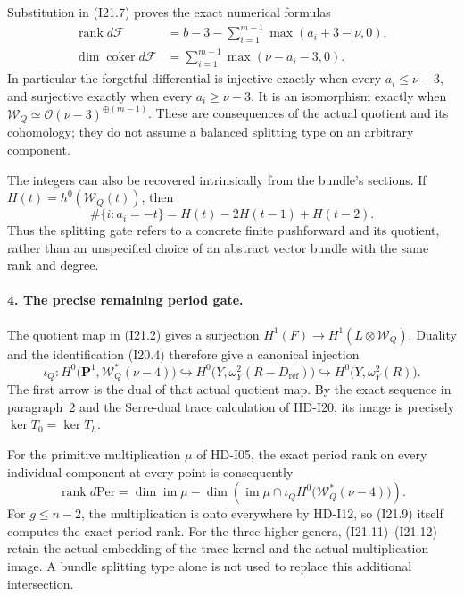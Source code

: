 Substitution in (I21.7) proves the exact numerical formulas
\begin{equation}
 \boxed{\begin{aligned}
 \operatorname{rank}d\mathcal F
       &=b-3-\sum_{i=1}^{m-1}\max(a_i+3-\nu,0),\\
 \dim\operatorname{coker}d\mathcal F
       &=\sum_{i=1}^{m-1}\max(\nu-a_i-3,0).
 \end{aligned}}                                      \tag{I21.9}
\end{equation}
In particular the forgetful differential is injective exactly
when every $a_i\leq\nu-3$, and surjective exactly when every
$a_i\geq\nu-3$. It is an isomorphism exactly when
$\mathcal W_Q\simeq\mathcal O(\nu-3)^{\oplus(m-1)}$.
These are consequences of the actual quotient and its cohomology;
they do not assume a balanced splitting type on an arbitrary
component.

The integers can also be recovered intrinsically from the bundle's
sections. If $H(t)=h^0(\mathcal W_Q(t))$, then
\begin{equation}
 \#\{i:a_i=-t\}=H(t)-2H(t-1)+H(t-2).                 \tag{I21.10}
\end{equation}
Thus the splitting gate refers to a concrete finite pushforward
and its quotient, rather than an unspecified choice of an
abstract vector bundle with the same rank and degree.

\paragraph{4. The precise remaining period gate.}
The quotient map in (I21.2) gives a surjection
$H^1(F)\to H^1(L\otimes\mathcal W_Q)$. Duality and the
identification (I20.4) therefore give a canonical injection
\begin{equation}
 \iota_Q:
 H^0\bigl(\mathbf P^1,\mathcal W_Q^*(\nu-4)\bigr)
       \hookrightarrow
 H^0\bigl(Y,\omega_Y^2(R-D_{\mathrm{ref}})\bigr)
       \hookrightarrow H^0\bigl(Y,\omega_Y^2(R)\bigr).
                                                        \tag{I21.11}
\end{equation}
The first arrow is the dual of that actual quotient map.
By the exact sequence in paragraph~2 and the Serre-dual trace
calculation of HD-I20, its image is precisely
$\ker T_0=\ker T_h$.

For the primitive multiplication $\mu$ of HD-I05, the exact
period rank on every individual component at every point is
consequently
\begin{equation}
 \operatorname{rank}d\mathrm{Per}
   =\dim\operatorname{im}\mu
    -\dim\left(\operatorname{im}\mu\cap
       \iota_QH^0\bigl(\mathcal W_Q^*(\nu-4)\bigr)\right).
                                                        \tag{I21.12}
\end{equation}
For $g\leq n-2$, the multiplication is onto everywhere by
HD-I12, so (I21.9) itself computes the exact period rank.
For the three higher genera, (I21.11)--(I21.12) retain the
actual embedding of the trace kernel and the actual multiplication
image. A bundle splitting type alone is not used to replace
this additional intersection.

